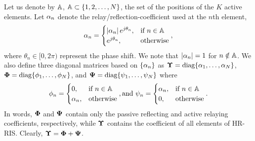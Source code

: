 \documentclass[conference]{IEEEtran}
\begin{document}
	Let us denote by $\mathbb{A}$, $\mathbb{A} \subset \{1,2,\ldots,N\}$, the set of the positions of the $K$ active elements. Let $\alpha_n$ denote the relay/reflection-coefficient used at the $n$th element,
	\begin{align}
	\label{def_alpha}
	\alpha_n =
	\begin{cases}
	\left|\alpha_n\right| e^{j \theta_n}, & \text{if } n \in \mathbb{A} \\
	e^{j \theta_n}, & \text{otherwise}
	\end{cases},
	\end{align}
	where $\theta_n \in [0, 2\pi)$ represent the phase shift. We note that $\left|\alpha_n\right| = 1$ for $n \notin \mathbb{A}$. We also define three diagonal matrices based on $\{\alpha_n\}$ as  $\boldsymbol{\Upsilon} = \text{diag} \{ \alpha_1, \ldots, \alpha_{N} \}$,  $\boldsymbol{\Phi} = \text{diag} \{ \phi_1, \ldots, \phi_{N} \}$,	and $\boldsymbol{\Psi} = \text{diag} \{ \psi_1, \ldots, \psi_{N} \}$ where
	\begin{align*}
	\phi_n =
	\begin{cases}
	0, & \text{if } n \in \mathbb{A} \\
	\alpha_n, & \text{otherwise}
	\end{cases}, \text{and } \psi_n =
	\begin{cases}
	\alpha_n, & \text{if } n \in \mathbb{A} \\
	0, & \text{otherwise}
	\end{cases}.
	\end{align*}
	In words, $\boldsymbol{\Phi}$ and $\boldsymbol{\Psi}$ contain only the passive reflecting and active relaying coefficients, respectively, while $\boldsymbol{\Upsilon}$ contains the coefficient of all elements of HR-RIS. Clearly, $\boldsymbol{\Upsilon} = \boldsymbol{\Phi} + \boldsymbol{\Psi}$.
	
\end{document}
